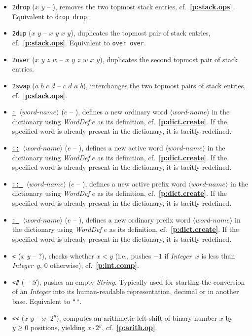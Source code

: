 \documentclass[12pt,oneside]{article}
\def\refpoint#1{{\rm\textbf{\ref{#1}}}}
\let\ptref=\refpoint
\begin{document}
\begin{itemize}
\item {\tt 2drop} ($x$ $y$ -- ), removes the two topmost stack entries, cf.~\ptref{p:stack.ops}. Equivalent to {\tt drop drop}.
\item {\tt 2dup} ($x$ $y$ -- $x$ $y$ $x$ $y$), duplicates the topmost pair of stack entries, cf.~\ptref{p:stack.ops}. Equivalent to {\tt over over}.
\item {\tt 2over} ($x$ $y$ $z$ $w$ -- $x$ $y$ $z$ $w$ $x$ $y$), duplicates the second topmost pair of stack entries.
\item {\tt 2swap} ($a$ $b$ $c$ $d$ -- $c$ $d$ $a$ $b$), interchanges the two topmost pairs of stack entries, cf.~\ptref{p:stack.ops}.
\item {\tt \underline{:} $\langle\textit{word-name}\rangle$} ($e$ -- ), defines a new ordinary word $\langle\textit{word-name}\rangle$ in the dictionary using {\em WordDef\/} $e$ as its definition, cf.~\ptref{p:dict.create}. If the specified word is already present in the dictionary, it is tacitly redefined.
\item {\tt \underline{::} $\langle\textit{word-name}\rangle$} ($e$ -- ), defines a new active word $\langle\textit{word-name}\rangle$ in the dictionary using {\em WordDef\/} $e$ as its definition, cf.~\ptref{p:dict.create}. If the specified word is already present in the dictionary, it is tacitly redefined.
\item {\tt \underline{::\_} $\langle\textit{word-name}\rangle$} ($e$ -- ), defines a new active prefix word $\langle\textit{word-name}\rangle$ in the dictionary using {\em WordDef\/} $e$ as its definition, cf.~\ptref{p:dict.create}. If the specified word is already present in the dictionary, it is tacitly redefined.
\item {\tt \underline{:\_} $\langle\textit{word-name}\rangle$} ($e$ -- ), defines a new ordinary prefix word $\langle\textit{word-name}\rangle$ in the dictionary using {\em WordDef\/} $e$ as its definition, cf.~\ptref{p:dict.create}. If the specified word is already present in the dictionary, it is tacitly redefined.
\item {\tt <} ($x$ $y$ -- $?$), checks whether $x<y$ (i.e., pushes $-1$ if {\em Integer\/}~$x$ is less than {\em Integer\/}~$y$, $0$ otherwise), cf.~\ptref{p:int.comp}.
\item {\tt <\#} ( -- $S$), pushes an empty {\em String}. Typically used for starting the conversion of an {\em Integer\/} into its human-readable representation, decimal or in another base. Equivalent to {\tt ""}.
\item {\tt <{}<} ($x$ $y$ -- $x\cdot 2^y$), computes an arithmetic left shift of binary number $x$ by $y\geq0$ positions, yielding $x\cdot 2^y$, cf.~\ptref{p:arith.op}.

\end{itemize}
\end{document}
